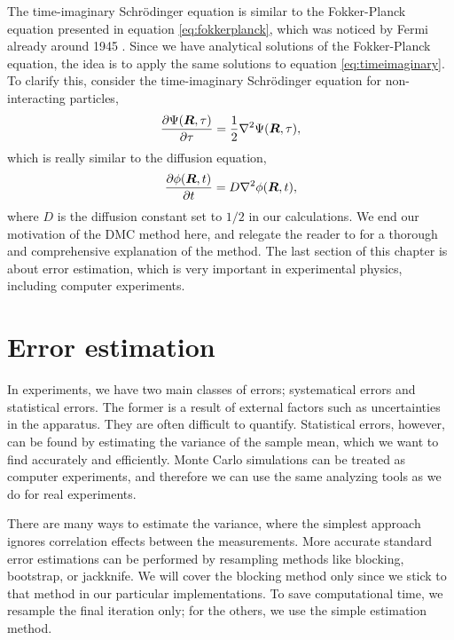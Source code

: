 The time-imaginary Schrödinger equation is similar to the Fokker-Planck equation presented in equation \eqref{eq:fokkerplanck}, which was noticed by Fermi already around 1945 \supercite{metropolis_monte_1949,ceperley_quantum_1986}. Since we have analytical solutions of the Fokker-Planck equation, the idea is to apply the same solutions to equation \eqref{eq:timeimaginary}. To clarify this, consider the time-imaginary Schrödinger equation for non-interacting particles,
\begin{equation}
\frac{\partial\Psi(\boldsymbol{{R}},\tau)}{\partial\tau}=\frac{1}{2}\nabla^2\Psi(\boldsymbol{{R}},\tau),
\end{equation}
which is really similar to the diffusion equation,
\begin{equation}
\frac{\partial\phi(\boldsymbol{{R}},t)}{\partial t}=D\nabla^2\phi(\boldsymbol{{R}},t),
\end{equation}
where $D$ is the diffusion constant set to $1/2$ in our calculations. We end our motivation of the DMC method here, and relegate the reader to \citet{kosztin_introduction_1996} for a thorough and comprehensive explanation of the method. The last section of this chapter is about error estimation, which is very important in experimental physics, including computer experiments. 

\section{Error estimation} \label{sec:variance}
In experiments, we have two main classes of errors; systematical errors and statistical errors. The former is a result of external factors such as uncertainties in the apparatus. They are often difficult to quantify. Statistical errors, however, can be found by estimating the variance of the sample mean, which we want to find accurately and efficiently. Monte Carlo simulations can be treated as computer experiments, and therefore we can use the same analyzing tools as we do for real experiments.

There are many ways to estimate the variance, where the simplest approach ignores correlation effects between the measurements. More accurate standard error estimations can be performed by resampling methods like blocking\supercite{flyvbjerg_error_1989}, bootstrap\supercite{efron_bootstrap_1979}, or jackknife\supercite{quenouille_problems_1949}. We will cover the blocking method only since we stick to that method in our particular implementations. To save computational time, we resample the final iteration only; for the others, we use the simple estimation method.

